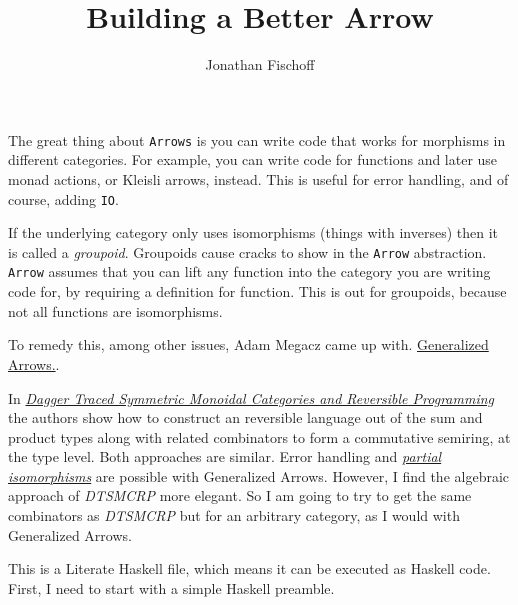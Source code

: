\documentclass{article}
\begin{document}
\title{Building a Better Arrow}
\author{Jonathan Fischoff}
\maketitle    
    
The great thing about {\tt Arrows} is you can write code that works for morphisms in different categories. For example, you can write code for functions and later use monad actions, or Kleisli arrows, instead. This is useful for error handling, and of course, adding {\tt IO}.

If the underlying category only uses isomorphisms (things with inverses) then it is called a {\sl groupoid}. Groupoids cause cracks to show in the {\tt Arrow} abstraction. {\tt Arrow} assumes that you can lift any function into the category you are writing code for, by requiring a definition for  function. This is out for groupoids, because not all functions are isomorphisms. 

To remedy this, among other issues, Adam Megacz came up with. \href{http://arxiv.org/pdf/1007.2885v2.pdf}{Generalized Arrows.}. 

In \href{https://www.cs.indiana.edu/~rpjames/papers/rc.pdf}{\sl Dagger Traced Symmetric Monoidal Categories and Reversible Programming} the authors show how to construct an reversible language out of the sum and product types along with related combinators to form a commutative semiring, at the type level. Both approaches are similar.
\vskip 6pt
Error handling and \href{http://www.informatik.uni-marburg.de/~rendel/rendel10invertible.pdf}{\sl partial isomorphisms} are possible with Generalized Arrows. However, I find the algebraic approach of {\sl DTSMCRP} more elegant. So I am going to try to get the same combinators as {\sl DTSMCRP} but for an arbitrary category, as I would with Generalized Arrows. 

This is a Literate Haskell file, which means it can be executed as Haskell code. First, I need to start with a simple Haskell preamble. 
\end{document}
